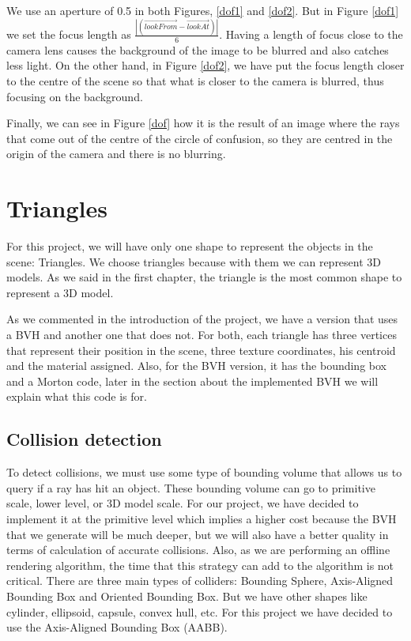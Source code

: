 \documentclass[titlepage,12pt]{report}
\begin{document}
We use an aperture of 0.5 in both Figures, \ref{dof1} and \ref{dof2}. But in Figure \ref{dof1} we set the focus length as $\frac{|(\vec{lookFrom}-\vec{lookAt})|}{6}$. Having a length of focus close to the camera lens causes the background of the image to be blurred and also catches less light. On the other hand, in Figure \ref{dof2}, we have put the focus length closer to the centre of the scene so that what is closer to the camera is blurred, thus focusing on the background.

Finally, we can see in Figure \ref{dof} how it is the result of an image where the rays that come out of the centre of the circle of confusion, so they are centred in the origin of the camera and there is no blurring.

\section{Triangles}

For this project, we will have only one shape to represent the objects in the scene: Triangles. We choose triangles because with them we can represent 3D models. As we said in the first chapter, the triangle is the most common shape to represent a 3D model.

As we commented in the introduction of the project, we have a version that uses a BVH and another one that does not. For both, each triangle has three vertices that represent their position in the scene, three texture coordinates, his centroid and the material assigned. Also, for the BVH version, it has the bounding box and a Morton code, later in the section about the implemented BVH we will explain what this code is for.

\subsection{Collision detection}

To detect collisions, we must use some type of bounding volume that allows us to query if a ray has hit an object. These bounding volume can go to primitive scale, lower level, or 3D model scale. For our project, we have decided to implement it at the primitive level which implies a higher cost because the BVH that we generate will be much deeper, but we will also have a better quality in terms of calculation of accurate collisions. Also, as we are performing an offline rendering algorithm, the time that this strategy can add to the algorithm is not critical. There are three main types of colliders: Bounding Sphere, Axis-Aligned Bounding Box and Oriented Bounding Box. But we have other shapes like cylinder, ellipsoid, capsule, convex hull, etc. For this project we have decided to use the Axis-Aligned Bounding Box (AABB).
\end{document}
